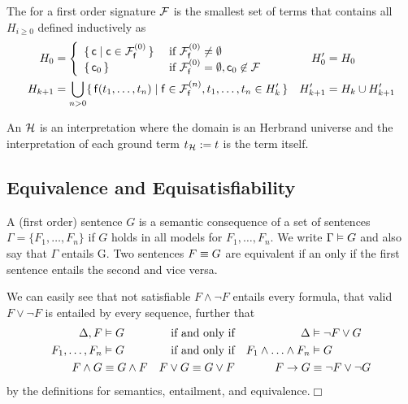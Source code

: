 \begin{definition}\label{def:hk}
	The  for a first order signature \( \mathcal{F} \)
	is the smallest set of terms that contains all \( H_{i\geq 0} \) defined inductively as
	\begin{align*}
	H_0 &=
	\left \{
	\begin{array}{ll}
	\{ \, \mc \mid \mc\in\mcFfn[0] \, \} 
	&\text{if } \mcFfn[0]\not=\emptyset
	\\
	\{ \, \mc_0 \, \}
	&\text{if } \mcFfn[0]=\emptyset, \mc_0\not\in\mcF
	\end{array}
	\right.
	&
	H'_0 &= H_0
	\\
	H_{k+1} &= \bigcup_{n> 0}
	\{ \, \mf(t_1,\ldots,t_n) \mid
	\mf\in\mcFfn[n],
	t_1,\ldots,t_n \in H_k' \, \}
	&
	H'_{k+1} &= H_k \cup H'_{k+1}
	\end{align*}

\end{definition}

\begin{definition}
	An  \( \mathcal{H} \) is an interpretation where the domain
	is an Herbrand universe
	and the interpretation of each ground term \( t_{\mathcal{H}} := t \) is the term itself.
\end{definition}





\subsection{Equivalence and Equisatisfiability}

\begin{definition}
	A (first order) sentence \( G \) is a semantic consequence of a set of sentences
	\( \Gamma = \{ F_1,\ldots,F_n \} \) if \( G \) holds in all models for \( F_1,\ldots,F_n \).
	We write \( \Gamma\vDash G \) and also say that \( \Gamma \) entails G.
	Two sentences \( F \equiv G \) are equivalent
	if an only if the first sentence entails the second and vice versa.
\end{definition}

\begin{lemma}
	We can easily see that not satisfiable \( F\land\lnot F \) entails every formula,
	that valid \( F\lor\lnot F \) is entailed by every sequence, further that
	\begin{align*}
	\Delta, F&\vDash G  &\text{if and only if} && \Delta &\vDash \lnot F\lor G \\
	F_1,\ldots,F_n&\vDash G  &\text{if and only if} && F_1\land\ldots\land F_n&\vDash G\\
	F\land G&\equiv G\land F &F\lor G\equiv G\lor F && F\rightarrow G &\equiv \lnot F\lor \lnot G
	\end{align*}
	by the definitions for semantics, entailment, and equivalence.\hfill\( \Box \)
\end{lemma}

